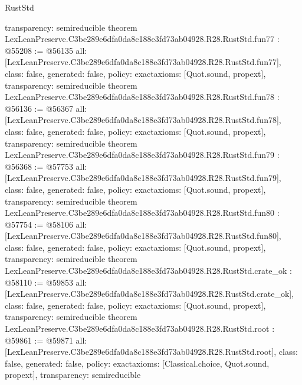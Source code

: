 \begin{lexlean}{RustStd}
\begin{coremodule}
{  transparency: semireducible
}
theorem LexLeanPreserve.C3be289e6dfa0da8c188e3fd73ab04928.R28.RustStd.fun77 : @55208 := @56135 {
  all: [LexLeanPreserve.C3be289e6dfa0da8c188e3fd73ab04928.R28.RustStd.fun77],
  class: false,
  generated: false,
  policy: exact{axioms: [Quot.sound, propext]},
  transparency: semireducible
}
theorem LexLeanPreserve.C3be289e6dfa0da8c188e3fd73ab04928.R28.RustStd.fun78 : @56136 := @56367 {
  all: [LexLeanPreserve.C3be289e6dfa0da8c188e3fd73ab04928.R28.RustStd.fun78],
  class: false,
  generated: false,
  policy: exact{axioms: [Quot.sound, propext]},
  transparency: semireducible
}
theorem LexLeanPreserve.C3be289e6dfa0da8c188e3fd73ab04928.R28.RustStd.fun79 : @56368 := @57753 {
  all: [LexLeanPreserve.C3be289e6dfa0da8c188e3fd73ab04928.R28.RustStd.fun79],
  class: false,
  generated: false,
  policy: exact{axioms: [Quot.sound, propext]},
  transparency: semireducible
}
theorem LexLeanPreserve.C3be289e6dfa0da8c188e3fd73ab04928.R28.RustStd.fun80 : @57754 := @58106 {
  all: [LexLeanPreserve.C3be289e6dfa0da8c188e3fd73ab04928.R28.RustStd.fun80],
  class: false,
  generated: false,
  policy: exact{axioms: [Quot.sound, propext]},
  transparency: semireducible
}
theorem LexLeanPreserve.C3be289e6dfa0da8c188e3fd73ab04928.R28.RustStd.crate_ok : @58110 := @59853 {
  all: [LexLeanPreserve.C3be289e6dfa0da8c188e3fd73ab04928.R28.RustStd.crate_ok],
  class: false,
  generated: false,
  policy: exact{axioms: [Quot.sound, propext]},
  transparency: semireducible
}
theorem LexLeanPreserve.C3be289e6dfa0da8c188e3fd73ab04928.R28.RustStd.root : @59861 := @59871 {
  all: [LexLeanPreserve.C3be289e6dfa0da8c188e3fd73ab04928.R28.RustStd.root],
  class: false,
  generated: false,
  policy: exact{axioms: [Classical.choice, Quot.sound, propext]},
  transparency: semireducible
}


\end{coremodule}
\end{lexlean}
